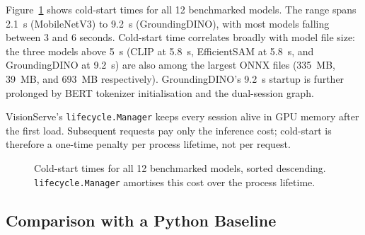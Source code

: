 Figure~\ref{fig:coldstart} shows cold-start times for all 12 benchmarked models.
The range spans 2.1~s (MobileNetV3) to 9.2~s (GroundingDINO), with most models
falling between 3 and 6 seconds.  Cold-start time correlates broadly with model file
size: the three models above 5~s (CLIP at 5.8~s, EfficientSAM at 5.8~s, and
GroundingDINO at 9.2~s) are also among the largest ONNX files (335~MB, 39~MB, and
693~MB respectively).  GroundingDINO's 9.2~s startup is further prolonged by
BERT tokenizer initialisation and the dual-session graph.

VisionServe's \texttt{lifecycle.Manager} keeps every session alive in GPU memory after
the first load.  Subsequent requests pay only the inference cost; cold-start is
therefore a one-time penalty per process lifetime, not per request.

\begin{figure}[t]
  \centering
  \caption{Cold-start times for all 12 benchmarked models, sorted descending.
           \texttt{lifecycle.Manager} amortises this cost over the process lifetime.}
  \label{fig:coldstart}
\end{figure}

\subsection{Comparison with a Python Baseline}
\label{sec:eval:python}

